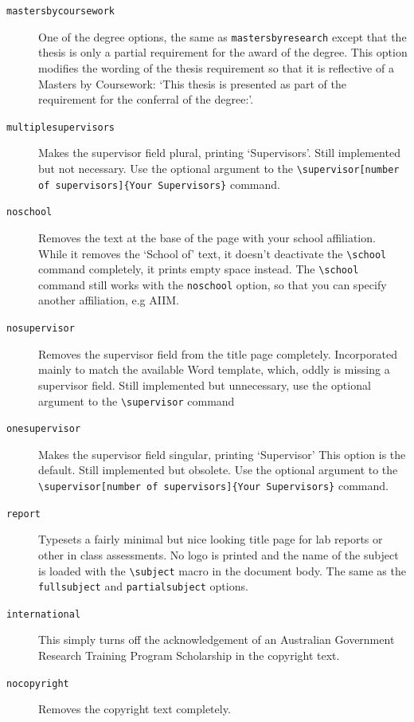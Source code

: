 \documentclass[12pt,oneside]{article}
\newcommand{\option}[1]{\texttt{\color{UOWblue}#1}}
\newcommand{\command}[1]{\texttt{\color{UOWred}#1}}
\newcommand{\comoptions}[1]{\texttt{\color{UOWdarkblue}#1}}
\begin{document}
\begin{description}
    \item[\option{mastersbycoursework}]
    One of the degree options, the same as \option{mastersbyresearch} except that the thesis is only a partial requirement for the award of the degree. This option modifies the wording of the thesis requirement so that it is reflective of a Masters by Coursework: `This thesis is presented as part of the requirement for the conferral of the degree:'.
    
    \item[\option{multiplesupervisors}]
    Makes the supervisor field plural, printing `Supervisors'. Still implemented but not necessary. Use the optional argument to the \command{\textbackslash{}supervisor}\option{[number of supervisors]}\comoptions{\{Your Supervisors\}} command.
    
    \item[\option{noschool}]
    Removes the text at the base of the page with your school affiliation. While it removes the `School of' text, it doesn't deactivate the \command{\textbackslash{}school} command completely, it prints empty space instead. The \command{\textbackslash{}school} command still works with the \option{noschool} option, so that you can specify another affiliation, e.g AIIM.
    
    \item[\option{nosupervisor}]
    Removes the supervisor field from the title page completely. Incorporated mainly to match the available Word template, which, oddly is missing a supervisor field. Still implemented but unnecessary, use the optional argument to the \command{\textbackslash{}supervisor} command
    
    \item[\option{onesupervisor}]
    Makes the supervisor field singular, printing `Supervisor' This option is the default. Still implemented but obsolete. Use the optional argument to the \command{\textbackslash{}supervisor}\option{[number of supervisors]}\comoptions{\{Your Supervisors\}} command.
    
    \item[\option{report}]
    Typesets a fairly minimal but nice looking title page for lab reports or other in class assessments. No logo is printed and the name of the subject is loaded with the \command{\textbackslash{}subject} macro in the document body. The same as the \option{fullsubject} and \option{partialsubject} options.
    
    \item[\option{international}]
    This simply turns off the acknowledgement of an Australian Government Research Training Program Scholarship in the copyright text.
    
    \item[\option{nocopyright}]
    Removes the copyright text completely.
    
\end{description}
\end{document}
